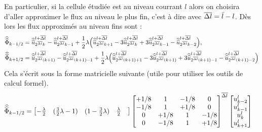 En particulier, si la cellule étudiée est au niveau courrant $l$ alors on choisira d'aller approximer le flux au niveau le plus fin, c'est à dire avec ${\overline{\Delta l}} = \bar l - l$.
Dès lors les flux approximés au niveau fins sont : 
\begin{align}
    \widehat{\widehat{\Phi}}_{k-1/2} &=  \widehat{\widehat{u}}^{l+{\overline{\Delta l}}}_{2^{\overline{\Delta l}} k} -  \widehat{\widehat{u}}^{l+{\overline{\Delta l}}}_{2^{\overline{\Delta l}} k-1} + \frac{1}{2} \lambda \Bigl(
         \widehat{\widehat{u}}^{l+{\overline{\Delta l}}}_{2^{\overline{\Delta l}} k+1}
         - 3 \widehat{\widehat{u}}^{l+{\overline{\Delta l}}}_{2^{\overline{\Delta l}} k}
         + 3 \widehat{\widehat{u}}^{l+{\overline{\Delta l}}}_{2^{\overline{\Delta l}} k-1}
         - \widehat{\widehat{u}}^{l+{\overline{\Delta l}}}_{2^{\overline{\Delta l}} k-2}
    \Bigr),\\
    \widehat{\widehat{\Phi}}_{k+1/2} &=  \widehat{\widehat{u}}^{l+{\overline{\Delta l}}}_{2^{\overline{\Delta l}} (k+1)} -  \widehat{\widehat{u}}^{l+{\overline{\Delta l}}}_{2^{\overline{\Delta l}} (k+1)-1} + \frac{1}{2} \lambda \Bigl(
         \widehat{\widehat{u}}^{l+{\overline{\Delta l}}}_{2^{\overline{\Delta l}} (k+1)+1}
         - 3 \widehat{\widehat{u}}^{l+{\overline{\Delta l}}}_{2^{\overline{\Delta l}} (k+1)}
         + 3 \widehat{\widehat{u}}^{l+{\overline{\Delta l}}}_{2^{\overline{\Delta l}} (k+1)-1}
         - \widehat{\widehat{u}}^{l+{\overline{\Delta l}}}_{2^{\overline{\Delta l}} (k+1)-2}
    \Bigr)
\end{align}
Cela s'écrit sous la forme matricielle suivante (utile pour utiliser les outils de calcul formel).
\begin{align}
    \widehat{\widehat{\Phi}}_{k-1/2}
        &=
    \begin{bmatrix}
        -\frac{\lambda}{2}&
        (\frac{3}{2} \lambda - 1)&
        (1 - \frac{3}{2} \lambda)&
        \frac{\lambda}{2}&
    \end{bmatrix}
    \begin{bmatrix}
        +1/8 & 1 & -1/8 & 0\\
        -1/8 & 1 & +1/8 & 0\\
        0 & +1/8 & 1 & -1/8\\
        0 & -1/8 & 1 & +1/8\\
    \end{bmatrix}^{{\overline{\Delta l}}}
    \begin{bmatrix}
        u^l_{k-2}\\
        u^l_{k-1}\\
        u^l_{k}\\
        u^l_{k+1}\\
    \end{bmatrix}
\end{align}
